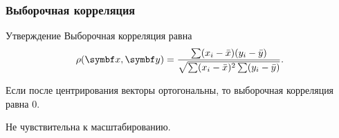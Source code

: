 \begin{frame}
  \frametitle{Выборочная корреляция}

  \begin{block}{Утверждение}
    Выборочная корреляция равна 
    \[
      \rho(\bx, \by) = \frac{\sum (x_i - \bar x)(y_i - \bar y)}{\sqrt{\sum (x_i - \bar x)^2 \sum (y_i - \bar y)}}.
    \]
  \end{block}

 
  Если после центрирования векторы ортогональны, то выборочная корреляция равна $0$. \pause

  Не чувствительна к масштабированию.

\end{frame}

